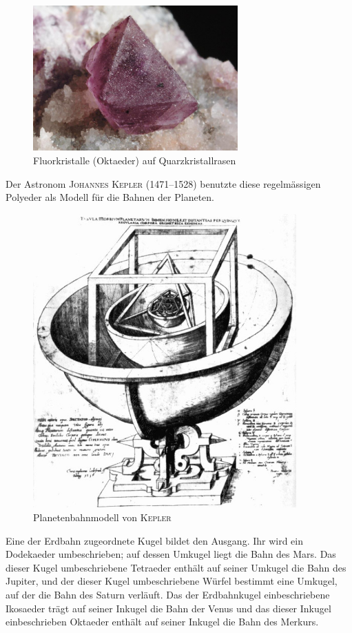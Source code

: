 \documentclass[%
11pt,%
twoside,%
titlepage,%
a4page,%
german,%
headsepline%
]{scrartcl}
\begin{document}
\begin{figure}
\begin{center}
\includegraphics[width=0.7\textwidth]{pictures/kristallo}
\end{center}
\caption{Fluorkristalle (Oktaeder) auf Quarzkristallrasen}
\end{figure}
Der Astronom \textsc{Johannes Kepler} (1471--1528) benutzte diese regelm\"assigen Polyeder als Modell f\"ur die Bahnen der Planeten.
\begin{figure}
\begin{center}
\includegraphics[width=0.9\textwidth]{pictures/kepler}
\end{center}
\caption{Planetenbahnmodell von \textsc{Kepler}}
\end{figure}
Eine der Erdbahn zugeordnete Kugel bildet den Ausgang. Ihr wird ein Dodekaeder umbeschrieben; auf dessen Umkugel liegt die Bahn des Mars. Das dieser Kugel umbeschriebene Tetraeder enth\"alt auf seiner Umkugel die Bahn des Jupiter, und der dieser Kugel umbeschriebene W\"urfel bestimmt eine Umkugel, auf der die Bahn des Saturn verl\"auft. Das der Erdbahnkugel einbeschriebene Ikosaeder tr\"agt auf seiner Inkugel die Bahn der Venus und das dieser Inkugel einbeschrieben Oktaeder enth\"alt auf seiner Inkugel die Bahn des Merkurs.
\end{document}

